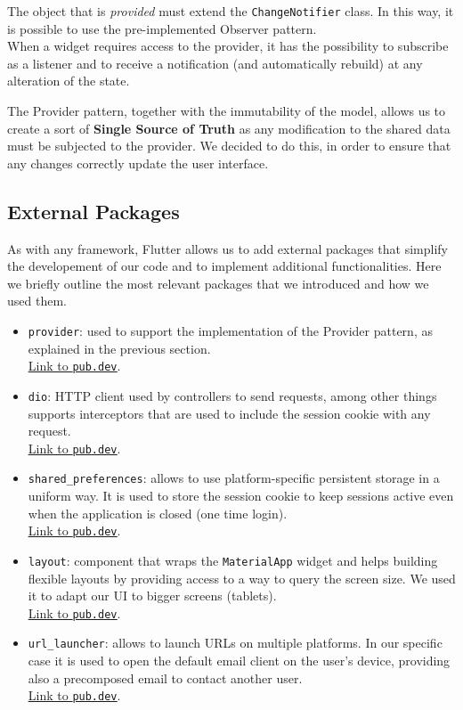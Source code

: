 The object that is \emph{provided} must extend the \texttt{ChangeNotifier} class. In this way, it is possible to use the pre-implemented Observer pattern.\\
When a widget requires access to the provider, it has the possibility to subscribe as a listener and to receive a notification (and automatically rebuild) at any alteration of the state.

The Provider pattern, together with the immutability of the model, allows us to create a sort of \textbf{Single Source of Truth} as any modification to the shared data must be subjected to the provider.
We decided to do this, in order to ensure that any changes correctly update the user interface.

\subsection{External Packages}
As with any framework, Flutter allows us to add external packages that simplify the developement of our code and to implement additional functionalities.
Here we briefly outline the most relevant packages that we introduced and how we used them.
\begin{itemize}
    \item \texttt{provider}: 
        used to support the implementation of the Provider pattern, as explained in the previous section.\\
        \underline{\href{https://pub.dev/packages/provider}{Link to \texttt{pub.dev}}}.
    \item \texttt{dio}: 
        HTTP client used by controllers to send requests, among other things supports interceptors that are 
        used to include the session cookie with any request.\\
        \underline{\href{https://pub.dev/packages/dio}{Link to \texttt{pub.dev}}}.
    \item \texttt{shared\_preferences}: 
        allows to use platform-specific persistent storage in a uniform way. It is used to store the session 
        cookie to keep sessions active even when the application is closed (one time login).\\
        \underline{\href{https://pub.dev/packages/shared_preferences}{Link to \texttt{pub.dev}}}.
    \item \texttt{layout}: 
        component that wraps the \texttt{MaterialApp} widget and helps building flexible layouts by providing
        access to a way to query the screen size. We used it to adapt our UI to bigger screens (tablets).\\
        \underline{\href{https://pub.dev/packages/layout}{Link to \texttt{pub.dev}}}.
    \item \texttt{url\_launcher}: 
        allows to launch URLs on multiple platforms. In our specific case it is used to open the default email
        client on the user's device, providing also a precomposed email to contact another user.\\
        \underline{\href{https://pub.dev/packages/url_launcher}{Link to \texttt{pub.dev}}}.
\end{itemize}


